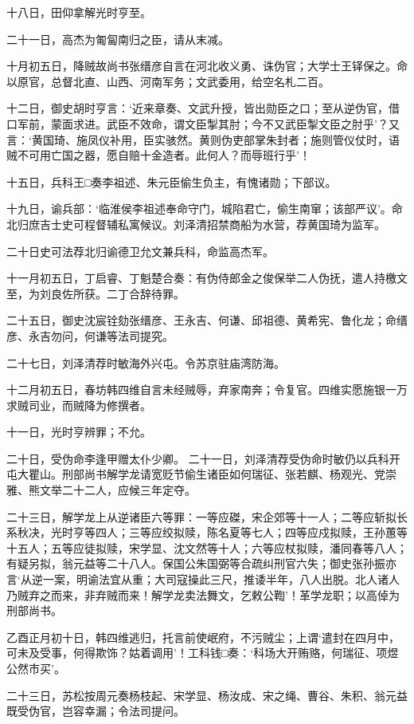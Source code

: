 \documentclass[]{article}
\begin{document}
十八日，田仰拿解光时亨至。

二十一日，高杰为匍匐南归之臣，请从末减。

十月初五日，降贼故尚书张缙彦自言在河北收义勇、诛伪官；大学士王铎保之。命以原官，总督北直、山西、河南军务；文武委用，给空名札二百。

十二日，御史胡时亨言：`近来章奏、文武升授，皆出勋臣之口；至从逆伪官，借口军前，蒙面求进。武臣不效命，谓文臣掣其肘；今不又武臣掣文臣之肘乎'？又言：`黄国琦、施凤仪补用，臣实骇然。黄则伪吏部掌朱封者；施则管仪仗时，语贼不可用亡国之器，愿自赔十金造者。此何人？而辱班行乎'！

十五日，兵科王□奏李祖述、朱元臣偷生负主，有愧诸勋；下部议。

十九日，谕兵部：`临淮侯李祖述奉命守门，城陷君亡，偷生南窜；该部严议'。命北归庶吉士史可程督辅私寓候议。刘泽清招禁商船为水营，荐黄国琦为监军。

二十日史可法荐北归谕德卫允文兼兵科，命监高杰军。

十一月初五日，丁启睿、丁魁楚合奏：有伪侍郎金之俊保举二人伪抚，遣人持檄文至，为刘良佐所获。二丁合辞待罪。

二十五日，御史沈宸铨劾张缙彦、王永吉、何谦、邱祖德、黄希宪、鲁化龙；命缙彦、永吉勿问，何谦等法司提究。

二十七日，刘泽清荐时敏海外兴屯。令苏京驻庙湾防海。

十二月初五日，春坊韩四维自言未经贼辱，弃家南奔；令复官。四维实愿施银一万求贼司业，而贼降为修撰者。

十一日，光时亨辨罪；不允。

二十日，受伪命李逢甲赠太仆少卿。
二十一日，刘泽清荐受伪命时敏仍以兵科开屯大瞿山。刑部尚书解学龙请宽贬节偷生诸臣如何瑞征、张若麒、杨观光、党崇雅、熊文举二十二人，应候三年定夺。

二十三日，解学龙上从逆诸臣六等罪：一等应磔，宋企郊等十一人；二等应斩拟长系秋决，光时亨等四人；三等应绞拟赎，陈名夏等七人；四等应戍拟赎，王孙蕙等十五人；五等应徒拟赎，宋学显、沈文然等十人；六等应杖拟赎，潘同春等八人；有疑另拟，翁元益等二十八人。保国公朱国弼等合疏纠刑官六失；御史张孙振亦言`从逆一案，明谕法宜从重；大司寇操此三尺，推诿半年，八人出脱。北人诸人乃贼弃之而来，非弃贼而来！解学龙卖法舞文，乞敕公鞫'！革学龙职；以高倬为刑部尚书。

乙酉正月初十日，韩四维逃归，托言前使岷府，不污贼尘；上谓`遣封在四月中，可未及受事，何得欺饰？姑着调用'！工科钱□奏：`科场大开贿赂，何瑞征、项煜公然市买'。

二十三日，苏松按周元奏杨枝起、宋学显、杨汝成、宋之绳、曹谷、朱积、翁元益既受伪官，岂容幸漏；令法司提问。
\end{document}
